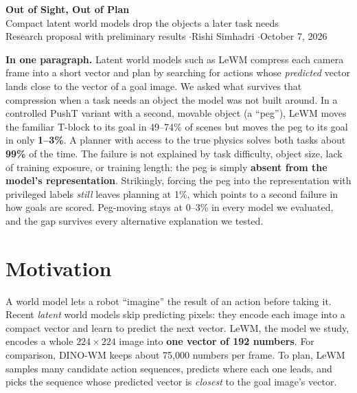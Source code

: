 \documentclass[11pt]{article}
\begin{document}
\begin{center}
{\LARGE\bfseries Out of Sight, Out of Plan}\\[4pt]
{\large Compact latent world models drop the objects a later task needs}\\[10pt]
{\normalsize Research proposal with preliminary results \quad$\cdot$\quad Rishi Simhadri \quad$\cdot$\quad October 7, 2026}
\end{center}

\vspace{4pt}
\begin{tcolorbox}[colback=white, colframe=muted!30, boxrule=0.5pt, arc=2pt, left=8pt, right=8pt]
\textbf{In one paragraph.} Latent world models such as LeWM compress each camera frame into a short vector and plan by searching for actions whose \emph{predicted} vector lands close to the vector of a goal image. We asked what survives that compression when a task needs an object the model was not built around. In a controlled PushT variant with a second, movable object (a ``peg''), LeWM moves the familiar T-block to its goal in 49--74\% of scenes but moves the peg to its goal in only \textbf{1--3\%}. A planner with access to the true physics solves both tasks about \textbf{99\%} of the time. The failure is not explained by task difficulty, object size, lack of training exposure, or training length: the peg is simply \textbf{absent from the model's representation}. Strikingly, forcing the peg into the representation with privileged labels \emph{still} leaves planning at 1\%, which points to a second failure in how goals are scored. Peg-moving stays at 0--3\% in every model we evaluated, and the gap survives every alternative explanation we tested.
\end{tcolorbox}

\section{Motivation}

A world model lets a robot ``imagine'' the result of an action before taking it. Recent \emph{latent} world models skip predicting pixels: they encode each image into a compact vector and learn to predict the next vector. LeWM, the model we study, encodes a whole $224\times224$ image into \textbf{one vector of 192 numbers}. For comparison, DINO-WM keeps about 75{,}000 numbers per frame. To plan, LeWM samples many candidate action sequences, predicts where each one leads, and picks the sequence whose predicted vector is \emph{closest} to the goal image's vector.
\end{document}
